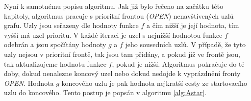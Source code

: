 Nyní k samotnému popisu algoritmu. Jak již bylo řečeno na začátku této kapitoly, algoritmus pracuje s prioritní frontou (\emph{OPEN}) nenavštívených uzlů grafu. Uzly jsou seřazeny dle hodnoty funkce $f$ a čím nižší je její hodnota, tím vyšší má uzel prioritu. V každé iteraci je uzel s nejnižší hodnotou funkce $f$ odebrán a jsou spočítány hodnoty $g$  a $f$ jeho sousedních uzlů. V případě, že tyto uzly nejsou v prioritní frontě, tak jsou tam přidány, a pokud již ve frontě jsou, tak aktualizujeme hodnotu funkce $f$, pokud je nižší. Algoritmus pokračuje do té doby, dokud nenalezne koncový uzel nebo dokud nedojde k vyprázdnění fronty \emph{OPEN}. Hodnota $g$ koncového uzlu je pak hodnota nejkratší cesty ze startovacího uzlu do koncového. Tento postup je popsán v algoritmu \ref{alg:Astar}.

%
